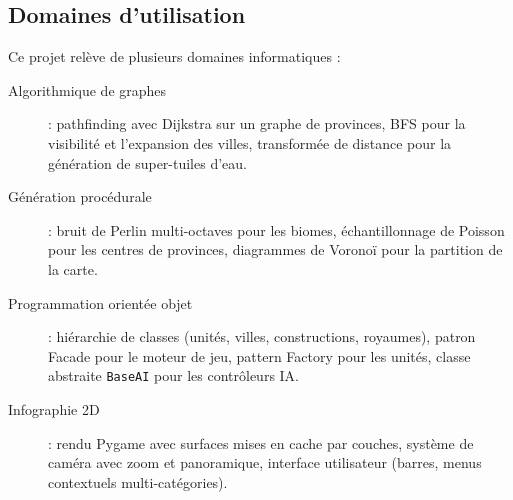 \documentclass[12pt, a4paper]{article}
\begin{document}
\subsection{Domaines d'utilisation}

Ce projet relève de plusieurs domaines informatiques :

\begin{description}
    \item[Algorithmique de graphes] : pathfinding avec Dijkstra sur un graphe de provinces,
    BFS pour la visibilité et l'expansion des villes, transformée de distance pour la
    génération de super-tuiles d'eau.
    \item[Génération procédurale] : bruit de Perlin multi-octaves pour les biomes, échantillonnage
    de Poisson pour les centres de provinces, diagrammes de Voronoï pour la partition de la carte.
    \item[Programmation orientée objet] : hiérarchie de classes (unités, villes, constructions,
    royaumes), patron Facade pour le moteur de jeu, pattern Factory pour les unités, classe
    abstraite \texttt{BaseAI} pour les contrôleurs IA.
    \item[Infographie 2D] : rendu Pygame avec surfaces mises en cache par couches, système de
    caméra avec zoom et panoramique, interface utilisateur (barres, menus contextuels
    multi-catégories).
\end{description}





\end{document}
